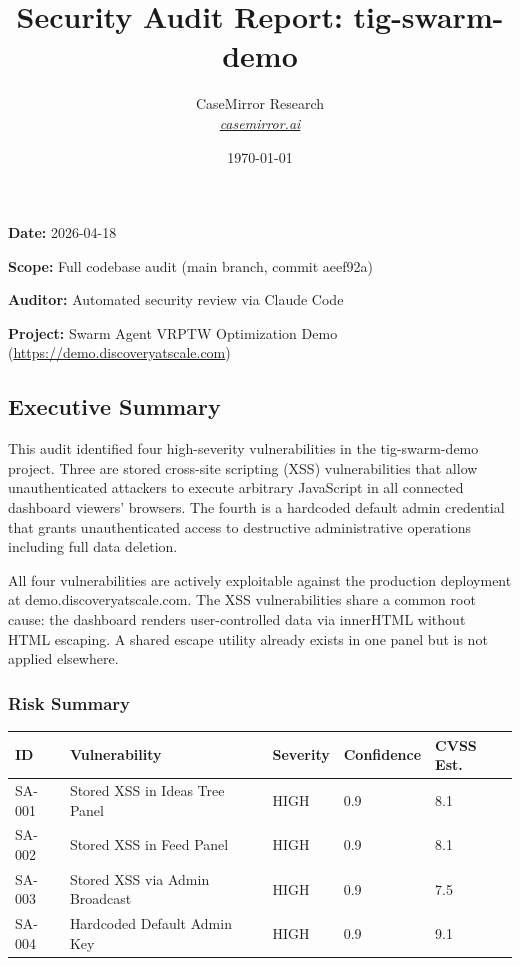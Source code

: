 \documentclass[twocolumn,10pt,letterpaper]{article}
\title{\vspace{-1.8em}\LARGE\bfseries\color{titlebg} Security Audit Report: tig-swarm-demo\vspace{-0.3em}}
\author{CaseMirror Research \\ \small\itshape\href{https://casemirror.ai}{\textcolor{headergray}{casemirror.ai}}}
\date{{\small\color{headergray} \today}}
\begin{document}
\maketitle
\thispagestyle{firstpage}
\vspace{-0.5em}


\textbf{Date:} 2026-04-18  

\textbf{Scope:} Full codebase audit (main branch, commit aeef92a)  

\textbf{Auditor:} Automated security review via Claude Code  

\textbf{Project:} Swarm Agent VRPTW Optimization Demo (\url{https://demo.discoveryatscale.com})


\subsection{Executive Summary}

This audit identified four high-severity vulnerabilities in the tig-swarm-demo project. Three are stored cross-site scripting (XSS) vulnerabilities that allow unauthenticated attackers to execute arbitrary JavaScript in all connected dashboard viewers' browsers. The fourth is a hardcoded default admin credential that grants unauthenticated access to destructive administrative operations including full data deletion.


All four vulnerabilities are actively exploitable against the production deployment at demo.discoveryatscale.com. The XSS vulnerabilities share a common root cause: the dashboard renders user-controlled data via innerHTML without HTML escaping. A shared escape utility already exists in one panel but is not applied elsewhere.


\subsubsection{Risk Summary}

\begin{table}[!ht]
\centering
\footnotesize
\begin{tabularx}{\textwidth}{@{}XXXXX@{}}
\toprule
\textbf{ID} & \textbf{Vulnerability} & \textbf{Severity} & \textbf{Confidence} & \textbf{CVSS Est.} \\
\midrule
SA-001 & Stored XSS in Ideas Tree Panel & HIGH & 0.9 & 8.1 \\
SA-002 & Stored XSS in Feed Panel & HIGH & 0.9 & 8.1 \\
SA-003 & Stored XSS via Admin Broadcast & HIGH & 0.9 & 7.5 \\
SA-004 & Hardcoded Default Admin Key & HIGH & 0.9 & 9.1 \\
\bottomrule
\end{tabularx}
\end{table}
\end{document}
